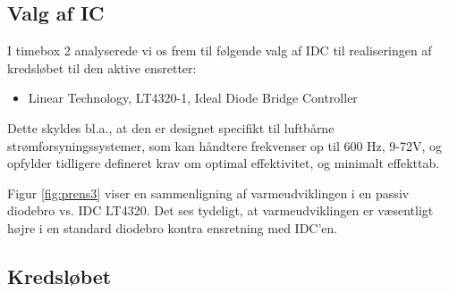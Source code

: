 \subsection{Valg af IC }
\label{sec:valg-af-ic}

I timebox 2 analyserede vi os frem til følgende valg af IDC til realiseringen af kredsløbet til den aktive ensretter:
\begin{itemize}
\item Linear Technology, LT4320-1, Ideal Diode Bridge Controller
\end{itemize}

Dette skyldes bl.a., at den er designet specifikt til luftbårne strømforsyningssystemer, som kan håndtere frekvenser op til 600 Hz, 9-72V, og opfylder tidligere defineret krav om optimal effektivitet, og minimalt effekttab.


Figur \ref{fig:prens3} viser en sammenligning af varmeudviklingen i en passiv diodebro vs. IDC LT4320. Det ses tydeligt, at varmeudviklingen er væsentligt højre i en standard diodebro kontra ensretning med IDC'en.  
\clearpage
\subsection{Kredsløbet}
\label{sec:kredslobet}

